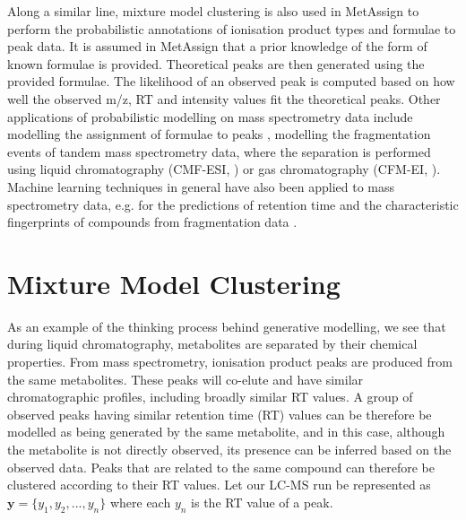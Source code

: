 Along a similar line, mixture model clustering is also used in MetAssign \cite{Daly2014} to perform the probabilistic annotations of ionisation product types and formulae to peak data. It is assumed in MetAssign that a prior knowledge of the form of known formulae is provided. Theoretical peaks are then generated using the provided formulae. The likelihood of an observed peak is computed based on how well the observed m/z, RT and intensity values fit the theoretical peaks. Other applications of probabilistic modelling on mass spectrometry data include modelling the assignment of formulae to peaks \cite{Rogers2009a, Silva2014}, modelling the fragmentation events of tandem mass spectrometry data, where the separation is performed using liquid chromatography (CMF-ESI, \cite{Allen2014}) or gas chromatography (CFM-EI, \cite{Allen2016}). Machine learning techniques in general have also been applied to mass spectrometry data, e.g. for the predictions of retention time \cite{Creek2011, Cao2015, Stanstrup2015} and the characteristic fingerprints of compounds from fragmentation data \cite{Heinonen2012a, Duhrkop2015}. 



\section{Mixture Model Clustering}
\label{sub:background-mixture-model-clustering}

As an example of the thinking process behind generative modelling, we see that during liquid chromatography, metabolites are separated by their chemical properties. From mass spectrometry, ionisation product peaks are produced from the same metabolites. These peaks will co-elute and have similar chromatographic profiles, including broadly similar RT values. A group of observed peaks having similar retention time (RT) values can be therefore be modelled as being generated by the same metabolite, and in this case, although the metabolite is not directly observed, its presence can be inferred based on the observed data. Peaks that are related to the same compound can therefore be clustered according to their RT values. Let our LC-MS run be represented as $\mathbf{y}=\{y_{1},y_{2},...,y_{n}\}$ where each $y_n$ is the RT value of a peak. 

